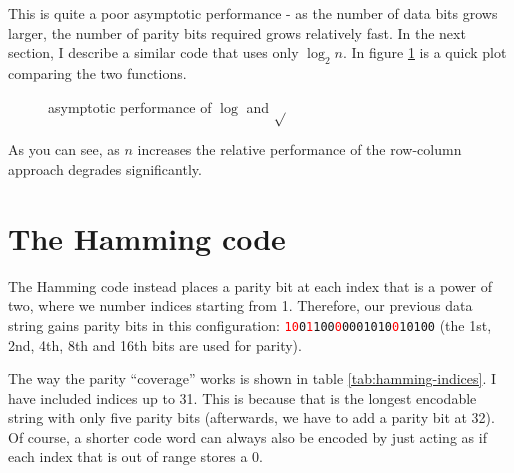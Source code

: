 \documentclass[a4paper,11pt]{article}
\begin{document}
    This is quite a poor asymptotic performance - as the number of data bits
    grows larger, the number of parity bits required grows relatively fast. In
    the next section, I describe a similar code that uses only $\log_2 n$. In
    figure \ref{fig:logsqrtplot} is a quick plot comparing the two functions.

\begin{figure}[H]
\begin{center}
\end{center}
\caption{asymptotic performance of $\log$ and $\sqrt{}$}\label{fig:logsqrtplot}
\end{figure}

    As you can see, as $n$ increases the relative performance of the row-column
    approach degrades significantly.

    \section{The Hamming code}

    The Hamming code instead places a parity bit at each index that is a power
    of two, where we number indices starting from 1. Therefore, our previous
    data string gains parity bits in this configuration:
    \texttt{\textcolor{red}{10}0\textcolor{red}{1}100\textcolor{red}{0}0001010\textcolor{red}{0}10100}
    (the 1st, 2nd, 4th, 8th and 16th bits are used for parity).

    The way the parity ``coverage'' works is shown in table
    \ref{tab:hamming-indices}.  I have included indices up to 31. This is
    because that is the longest encodable string with only five parity bits
    (afterwards, we have to add a parity bit at 32). Of course, a shorter code
    word can always also be encoded by just acting as if each index that is out
    of range stores a 0.
\end{document}
